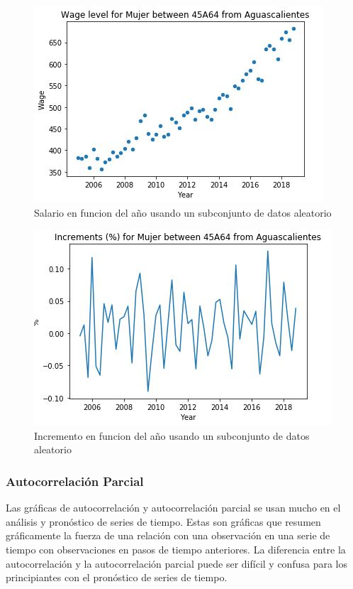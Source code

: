 \begin{figure}[h!]
	\centering
	\includegraphics[width=0.8\linewidth]{Figure/AGSwageVSyear_visualizacionJPG.JPG}
	\caption{Salario en funcion del año usando un subconjunto de datos aleatorio} 
	\label{fig:AGSwageVSyear}
\end{figure}

\begin{figure}[h!]
	\centering
	\includegraphics[width=0.8\linewidth]{Figure/AGSIncrementsVSyear_visualizacion.JPG}
	\caption{Incremento en funcion del a\~no usando un subconjunto de datos aleatorio} 
	\label{fig:AGSIncrementsVSyear}
\end{figure}


\subsubsection{Autocorrelaci\'on Parcial}
Las gr\'aficas de autocorrelaci\'on y autocorrelaci\'on parcial se usan mucho en el an\'alisis y pron\'ostico de series de tiempo.
Estas son gr\'aficas que resumen gr\'aficamente la fuerza de una relaci\'on con una observaci\'on en una serie de tiempo con observaciones en pasos de tiempo anteriores. La diferencia entre la autocorrelaci\'on y la autocorrelaci\'on parcial puede ser dif\'icil y confusa para los principiantes con el pron\'ostico de series de tiempo.

